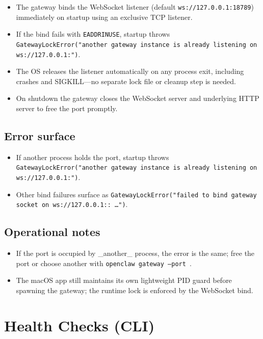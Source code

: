 \begin{itemize}
  \item The gateway binds the WebSocket listener (default \texttt{ws://127.0.0.1:18789}) immediately on startup using an exclusive TCP listener.
  \item If the bind fails with \texttt{EADDRINUSE}, startup throws \texttt{GatewayLockError("another gateway instance is already listening on ws://127.0.0.1:")}.
  \item The OS releases the listener automatically on any process exit, including crashes and SIGKILL—no separate lock file or cleanup step is needed.
  \item On shutdown the gateway closes the WebSocket server and underlying HTTP server to free the port promptly.
\end{itemize}


\subsection{Error surface}


\begin{itemize}
  \item If another process holds the port, startup throws \texttt{GatewayLockError("another gateway instance is already listening on ws://127.0.0.1:")}.
  \item Other bind failures surface as \texttt{GatewayLockError("failed to bind gateway socket on ws://127.0.0.1:: …")}.
\end{itemize}


\subsection{Operational notes}


\begin{itemize}
  \item If the port is occupied by \_another\_ process, the error is the same; free the port or choose another with \texttt{openclaw gateway --port }.
  \item The macOS app still maintains its own lightweight PID guard before spawning the gateway; the runtime lock is enforced by the WebSocket bind.
\end{itemize}



\clearpage

\section{Health Checks (CLI)}


